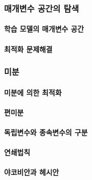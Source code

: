 \documentclass [12pt] {oblivoir}
\let\oldsubsubsection=\subsubsection
\renewcommand{\subsubsection}
{
  \filbreak
  \oldsubsubsection
}
\begin{document}
\subsubsection{매개변수 공간의 탐색}

\paragraph*{학습 모델의 매개변수 공간}\mbox{}

\vspace{3mm}

\paragraph*{최적화 문제해결}\mbox{}

\vspace{3mm}

\subsubsection{미분}

\paragraph*{미분에 의한 최적화}\mbox{}

\vspace{3mm}

\paragraph*{편미분}\mbox{}

\vspace{3mm}

\paragraph*{독립변수와 종속변수의 구분}\mbox{}

\vspace{3mm}

\paragraph*{연쇄법칙}\mbox{}

\vspace{3mm}

\paragraph*{야코비안과 헤시안}\mbox{}
\end{document}
